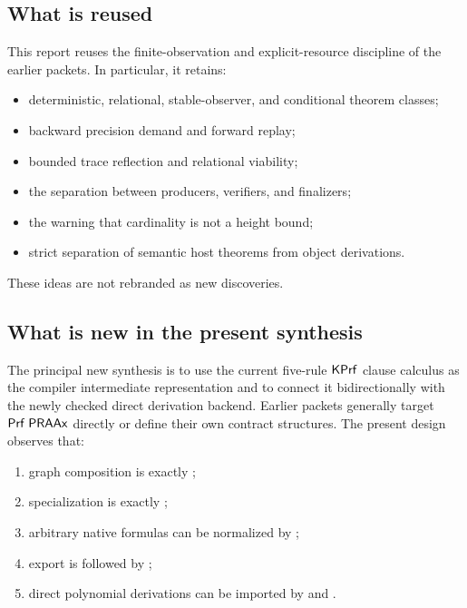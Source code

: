 \subsection{What is reused}

This report reuses the finite-observation and explicit-resource discipline of
the earlier packets.  In particular, it retains:

\begin{itemize}
\item deterministic, relational, stable-observer, and conditional theorem
classes;
\item backward precision demand and forward replay;
\item bounded trace reflection and relational viability;
\item the separation between producers, verifiers, and finalizers;
\item the warning that cardinality is not a height bound;
\item strict separation of semantic host theorems from object derivations.
\end{itemize}

These ideas are not rebranded as new discoveries.

\subsection{What is new in the present synthesis}

The principal new synthesis is to use the current five-rule \(\mathsf{KPrf}\) clause
calculus as the compiler intermediate representation and to connect it
bidirectionally with the newly checked direct derivation backend.  Earlier
packets generally target \(\mathsf{Prf}\;\mathsf{PRAAx}\) directly or define their own contract
structures.  The present design observes that:

\begin{enumerate}
\item graph composition is exactly ;
\item specialization is exactly ;
\item arbitrary native formulas can be normalized by ;
\item export is  followed by ;
\item direct polynomial derivations can be imported by
 and .
\end{enumerate}

